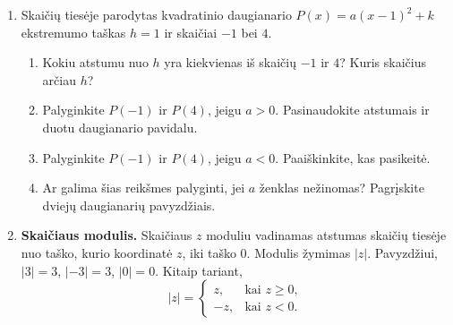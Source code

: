 \documentclass[12pt,a4paper]{article}
\begin{document}
\begin{enumerate}
\begin{enumerate}
\item $R(x)=4(x+1)^2-3$: palyginkite $R(-4)$ ir $R(2)$.
\item $S(x)=-(x+2)^2+7$: palyginkite $S(-1)$ ir $S(-4)$.
\end{enumerate}
\item Skaičių tiesėje parodytas kvadratinio daugianario $P(x)=a(x-1)^2+k$ ekstremumo taškas $h=1$ ir skaičiai $-1$ bei $4$.
\begin{center}\end{center}
\begin{enumerate}
\item Kokiu atstumu nuo $h$ yra kiekvienas iš skaičių $-1$ ir $4$? Kuris skaičius arčiau $h$?
\item Palyginkite $P(-1)$ ir $P(4)$, jeigu $a>0$. Pasinaudokite atstumais ir duotu daugianario pavidalu.
\item Palyginkite $P(-1)$ ir $P(4)$, jeigu $a<0$. Paaiškinkite, kas pasikeitė.
\item Ar galima šias reikšmes palyginti, jei $a$ ženklas nežinomas? Pagrįskite dviejų daugianarių pavyzdžiais.
\end{enumerate}
\item \textbf{Skaičiaus modulis.} Skaičiaus $z$ moduliu vadinamas atstumas skaičių tiesėje nuo taško, kurio koordinatė $z$, iki taško $0$. Modulis žymimas $|z|$. Pavyzdžiui, $|3|=3$, $|-3|=3$, $|0|=0$. Kitaip tariant,
\[
|z|=\begin{cases}z,&\text{kai }z\ge0,\\-z,&\text{kai }z<0.\end{cases}
\]
\begin{center}
\end{center}
\end{enumerate}
\end{document}
